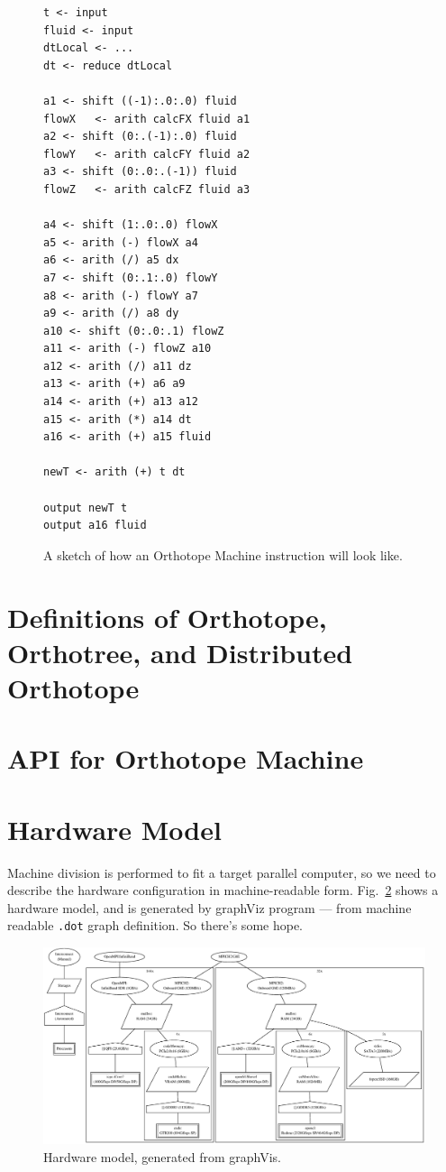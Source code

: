 \documentclass[twocolumn]{article}
\begin{document}
\begin{figure}
\begin{verbatim}
t <- input 
fluid <- input
dtLocal <- ...
dt <- reduce dtLocal

a1 <- shift ((-1):.0:.0) fluid
flowX   <- arith calcFX fluid a1
a2 <- shift (0:.(-1):.0) fluid
flowY   <- arith calcFY fluid a2
a3 <- shift (0:.0:.(-1)) fluid
flowZ   <- arith calcFZ fluid a3

a4 <- shift (1:.0:.0) flowX
a5 <- arith (-) flowX a4
a6 <- arith (/) a5 dx
a7 <- shift (0:.1:.0) flowY
a8 <- arith (-) flowY a7
a9 <- arith (/) a8 dy
a10 <- shift (0:.0:.1) flowZ
a11 <- arith (-) flowZ a10
a12 <- arith (/) a11 dz
a13 <- arith (+) a6 a9
a14 <- arith (+) a13 a12
a15 <- arith (*) a14 dt
a16 <- arith (+) a15 fluid

newT <- arith (+) t dt

output newT t
output a16 fluid
\end{verbatim}
  \caption{A sketch of how an Orthotope Machine instruction will look
    like.}\label{FigureOMInst}
\end{figure}





\section{Definitions of Orthotope, Orthotree, and Distributed Orthotope}

\section{API for Orthotope Machine}


\section{Hardware Model}

Machine division is performed to fit a target parallel computer, so we
need to describe the hardware configuration in machine-readable form.
Fig.~\ref{FigureHardware} shows a hardware model, and is generated by
graphViz program --- from machine readable {\tt .dot} graph
definition. So there's some hope. 

\begin{figure}
  \begin{center}
    \includegraphics[scale=0.3]{hardware_graph.eps}
  \end{center}
  \caption{Hardware model, generated from graphVis.}\label{FigureHardware}
\end{figure}
\end{document}
